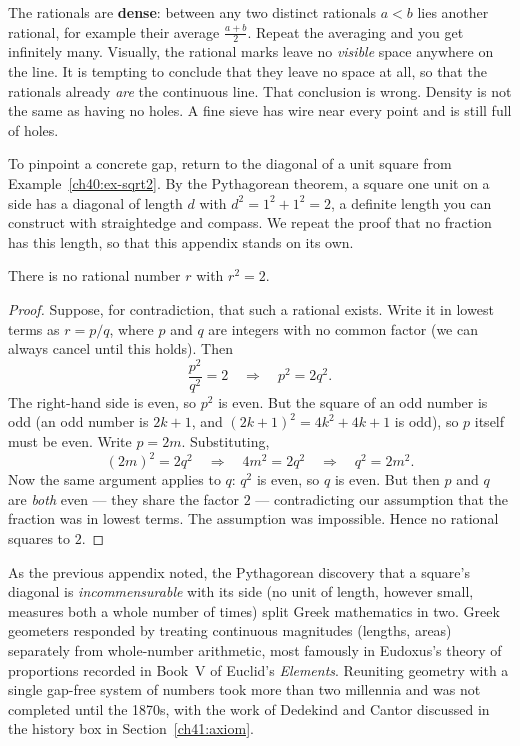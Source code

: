 \begin{intuitionbox}
The rationals are \textbf{dense}: between any two distinct rationals $a<b$ lies another
rational, for example their average $\frac{a+b}{2}$. Repeat the averaging and you get
infinitely many. Visually, the rational marks leave no \emph{visible} space anywhere on
the line. It is tempting to conclude that they leave no space at all, so that
the rationals already \emph{are} the continuous line. That conclusion is wrong. Density is not
the same as having no holes. A fine sieve has wire near every point and is still full of holes.
\end{intuitionbox}

To pinpoint a concrete gap, return to the diagonal of a unit square from
Example~\ref{ch40:ex-sqrt2}. By the Pythagorean theorem, a square one unit on a side
has a diagonal of length $d$ with $d^2 = 1^2 + 1^2 = 2$, a definite length you can
construct with straightedge and compass. We repeat the proof that no fraction has
this length, so that this appendix stands on its own.

\begin{theorem}
\label{ch41:sqrt2-irrational}
There is no rational number $r$ with $r^2 = 2$.
\end{theorem}

\begin{proof}
Suppose, for contradiction, that such a rational exists. Write it in lowest terms as
$r = p/q$, where $p$ and $q$ are integers with no common factor (we can always cancel until
this holds). Then
\[
  \frac{p^2}{q^2} = 2 \quad\Longrightarrow\quad p^2 = 2q^2.
\]
The right-hand side is even, so $p^2$ is even. But the square of an odd number is odd
(an odd number is $2k+1$, and $(2k+1)^2 = 4k^2+4k+1$ is odd), so $p$ itself must be even.
Write $p = 2m$. Substituting,
\[
  (2m)^2 = 2q^2 \quad\Longrightarrow\quad 4m^2 = 2q^2 \quad\Longrightarrow\quad q^2 = 2m^2.
\]
Now the same argument applies to $q$: $q^2$ is even, so $q$ is even. But then $p$ and $q$
are \emph{both} even --- they share the factor $2$ --- contradicting our assumption that
the fraction was in lowest terms. The assumption was impossible. Hence no rational squares
to $2$.
\end{proof}

\begin{connectionbox}
As the previous appendix noted, the Pythagorean discovery that a square's diagonal
is \emph{incommensurable} with its side (no unit of length, however small, measures
both a whole number of times) split Greek mathematics in two. Greek geometers responded by treating continuous magnitudes (lengths,
areas) separately from whole-number arithmetic, most famously in Eudoxus's theory
of proportions recorded in Book~V of Euclid's \emph{Elements}. Reuniting geometry
with a single gap-free system of numbers took more than two millennia and was not
completed until the 1870s, with the work of Dedekind and Cantor discussed in the
history box in Section~\ref{ch41:axiom}.
\end{connectionbox}

